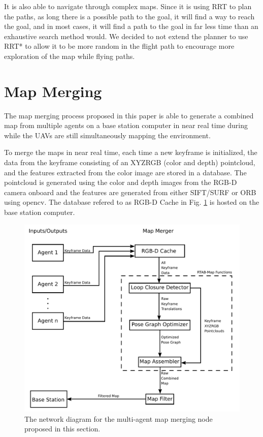 \documentclass[letterpaper, 10 pt, conference]{ieeeconf}  %
\begin{document}
It is also able to navigate through complex maps. Since it is using RRT to plan the paths, as long there is a possible path to the goal, it will find a way to reach the goal, and in most cases, it will find a path to the goal in far less time than an exhaustive search method would. We decided to not extend the planner to use RRT* to allow it to be more random in the flight path to encourage more exploration of the map while flying paths.

\section{Map Merging}\label{merge}

The map merging process proposed in this paper is able to generate a combined map from multiple agents on a base station computer in near real time during while the UAVs are still simultaneously mapping the environment.

To merge the maps in near real time, each time a new keyframe is initialized, the data from the keyframe consisting of an XYZRGB (color and depth) pointcloud, and the features extracted from the color image are stored in a database. The pointcloud is generated using the color and depth images from the RGB-D camera onboard and the features are generated from either SIFT/SURF or ORB using opencv. The database refered to as RGB-D Cache in Fig. \ref{fig:map_merge} is hosted on the base station computer.

\begin{figure}
\centering
\includegraphics[width=0.7\linewidth]{map_merger_network}
\caption{The network diagram for the multi-agent map merging node proposed in this section.}
\label{fig:map_merge}
\end{figure}
\end{document}

